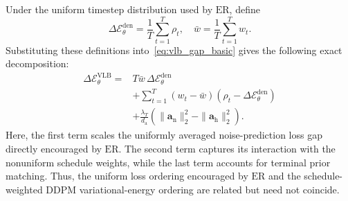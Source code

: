 \documentclass[9pt,journal]{IEEEtran}
\newcommand{\Eden}{\ensuremath{\mathcal{E}_{\theta}^{\mathrm{den}}}}
\newcommand{\Eelbo}{\ensuremath{\mathcal{E}_{\theta}^{\mathrm{VLB}}}}
\newcommand{\ER}{\ensuremath{\mathrm{ER}}}
\newcommand{\va}{\bm{a}}
\newcommand{\vah}{\ensuremath{\va_{\mathrm h}}}      %
\newcommand{\van}{\ensuremath{\va_{\mathrm n}}}      %
\begin{document}
Under the uniform timestep distribution used by \ER{}, define
\begin{equation*}
    \Delta\Eden
    =
    \frac{1}{T}
    \sum_{t=1}^{T}\rho_t,
    \quad
    \bar w
    =
    \frac{1}{T}
    \sum_{t=1}^{T}w_t.
\end{equation*}
Substituting these definitions into~\eqref{eq:vlb_gap_basic} gives the following exact decomposition:
\begin{equation}
    \begin{aligned}
        \Delta\Eelbo
        ={}&
        T\bar w\,\Delta\Eden
        \\
        &+
        \sum_{t=1}^{T}
        (w_t-\bar w)
        (\rho_t-\Delta\Eden)
        \\
        &+
        \frac{\lambda_T}{d_{\mathrm a}}
        \left(
        \|\van\|_2^2-\|\vah\|_2^2
        \right).
    \end{aligned}
    \label{eq:vlb_decomposition}
\end{equation}
Here, the first term scales the uniformly averaged noise-prediction loss gap directly encouraged by \ER{}. The second term captures its interaction with the nonuniform schedule weights, while the last term accounts for terminal prior matching. Thus, the uniform loss ordering encouraged by \ER{} and the schedule-weighted DDPM variational-energy ordering are related but need not coincide.



\end{document}
